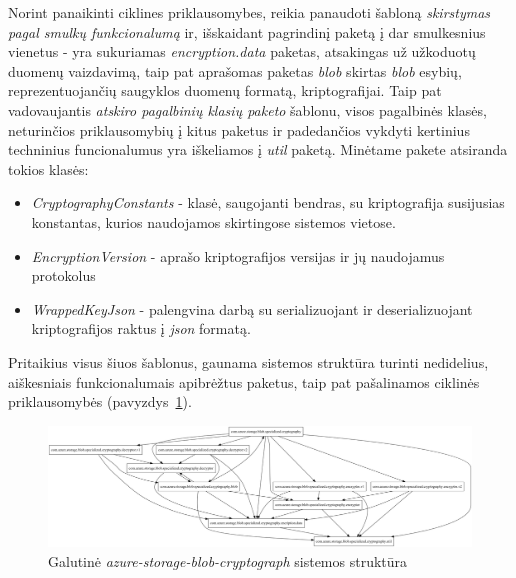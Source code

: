 Norint panaikinti ciklines priklausomybes, reikia panaudoti šabloną \textit{skirstymas pagal smulkų funkcionalumą} ir, išskaidant pagrindinį paketą
į dar smulkesnius vienetus - yra sukuriamas \textit{encryption.data} paketas, atsakingas už užkoduotų duomenų vaizdavimą, taip pat
aprašomas paketas \textit{blob} skirtas \textit{blob} esybių, reprezentuojančių saugyklos duomenų formatą, kriptografijai.
Taip pat vadovaujantis \textit{atskiro pagalbinių klasių paketo} šablonu, visos pagalbinės klasės, neturinčios priklausomybių į kitus paketus ir
padedančios vykdyti kertinius techninius funcionalumus yra iškeliamos į \textit{util} paketą.
Minėtame pakete atsiranda tokios klasės:
\begin{itemize}
    \item \textit{CryptographyConstants} - klasė, saugojanti bendras, su kriptografija susijusias konstantas, kurios naudojamos skirtingose sistemos vietose.
    \item \textit{EncryptionVersion} - aprašo kriptografijos versijas ir jų naudojamus protokolus
    \item \textit{WrappedKeyJson} - palengvina darbą su serializuojant ir deserializuojant kriptografijos raktus į \textit{json} formatą.
\end{itemize}

Pritaikius visus šiuos šablonus, gaunama sistemos struktūra turinti nedidelius, aiškesniais funkcionalumais apibrėžtus paketus,
taip pat pašalinamos ciklinės priklausomybės (pavyzdys~\ref{fig:azure_packages_v2}).
\begin{figure}[H]
    \centering
    \includegraphics[scale=0.3]{img/azure_packages_v2}
    \caption{Galutinė \textit{azure-storage-blob-cryptograph} sistemos struktūra}
    \label{fig:azure_packages_v2}
\end{figure}

